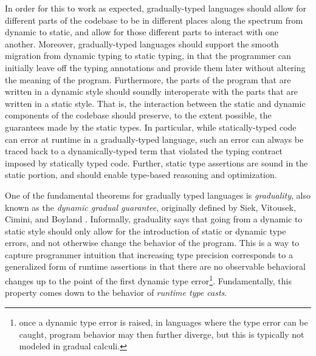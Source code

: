 In order for this to work as expected, gradually-typed languages should allow for
different parts of the codebase to be in different places along the spectrum from
dynamic to static, and allow for those different parts to interact with one another.
Moreover, gradually-typed languages should support the smooth migration from
dynamic typing to static typing, in that the programmer can initially leave off the
typing annotations and provide them later without altering the meaning of the program.
Furthermore, the parts of the program that are written in a dynamic
style should soundly interoperate with the parts that are written in a
static style.  That is, the interaction between the static and dynamic
components of the codebase should preserve, to the extent possible,
the guarantees made by the static types.  In particular, while
statically-typed code can error at runtime in a gradually-typed
language, such an error can always be traced back to a
dynamically-typed term that violated the typing contract imposed by
statically typed code. Further, static type assertions are sound in
the static portion, and should enable type-based reasoning and
optimization.


One of the fundamental theorems for gradually typed languages is
\emph{graduality}, also known as the \emph{dynamic gradual guarantee},
originally defined by Siek, Vitousek, Cimini, and Boyland
\cite{siek_et_al:LIPIcs:2015:5031, new-ahmed2018}.
%
Informally, graduality says that going from a dynamic to static style should
only allow for the introduction of static or dynamic type errors, and not
otherwise change the behavior of the program.
%
This is a way to capture programmer intuition that increasing type
precision corresponds to a generalized form of runtime assertions in
that there are no observable behavioral changes up to the point of the
first dynamic type error\footnote{once a dynamic type error is raised,
in languages where the type error can be caught, program behavior may
then further diverge, but this is typically not modeled in gradual
calculi.}.
%
Fundamentally, this property comes down to the behavior of
\emph{runtime type casts}.

